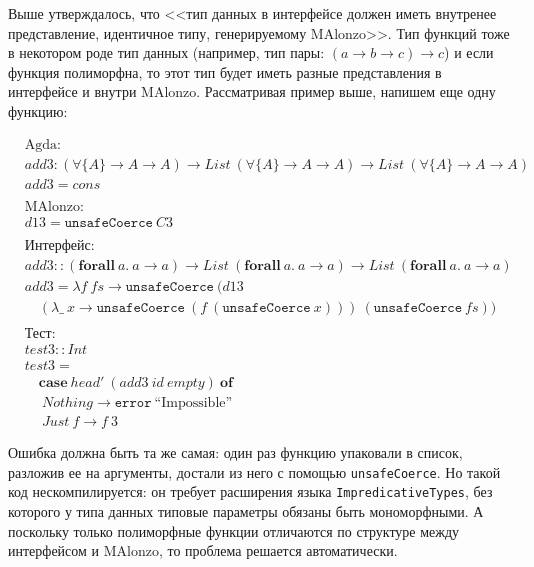 Выше утверждалось, что <<тип данных в интерфейсе должен иметь внутренее представление,
идентичное типу, генерируемому MAlonzo>>. Тип функций тоже в некотором роде тип данных
(например, тип пары: \((a \rightarrow b \rightarrow c) \rightarrow c\)) и если функция
полиморфна, то этот тип будет иметь разные представления в интерфейсе и внутри MAlonzo.
Рассматривая пример выше, напишем еще одну функцию:

\begin{align*}
&\text{Agda:}\\
&add3 : (\forall \{A\} \rightarrow A \rightarrow A) \rightarrow List\ (\forall \{A\}
   \rightarrow A \rightarrow A) \rightarrow List\ (\forall \{A\} \rightarrow A
   \rightarrow A)\\
&add3 = cons\\
\\
&\text{MAlonzo:}\\
&d13 = \texttt{unsafeCoerce}\ C3\\
\\
&\text{Интерфейс:}\\
&add3 :: (\mathbf{forall}\ a.\ a \rightarrow a) \rightarrow
   List\ (\mathbf{forall}\ a.\ a \rightarrow a) \rightarrow
   List\ (\mathbf{forall}\ a.\ a \rightarrow a)\\
&add3 = \lambda f\ fs \rightarrow \texttt{unsafeCoerce}\ (d13\\
&\quad(\lambda \_\ x \rightarrow \texttt{unsafeCoerce}\ (
      f\ (\texttt{unsafeCoerce}\ x)))
   \ (\texttt{unsafeCoerce}\ fs))\\
\\
&\text{Тест:}\\
&test3 :: Int\\
&test3 =\\
&\quad\mathbf{case}\ head'\ (add3\ id\ empty)\ \mathbf{of}\\
&\quad\ Nothing \rightarrow \texttt{error}\ \text{``Impossible''}\\
&\quad\ Just\ f \rightarrow f\ 3
\end{align*}

Ошибка должна быть та же самая: один раз функцию упаковали в список, разложив ее
на аргументы, достали из него с помощью \texttt{unsafeCoerce}. Но такой код
нескомпилируется: он требует расширения языка \texttt{ImpredicativeTypes},
без которого у типа данных типовые параметры обязаны быть мономорфными. А поскольку
только полиморфные функции отличаются по структуре между интерфейсом и MAlonzo,
то проблема решается автоматически.

